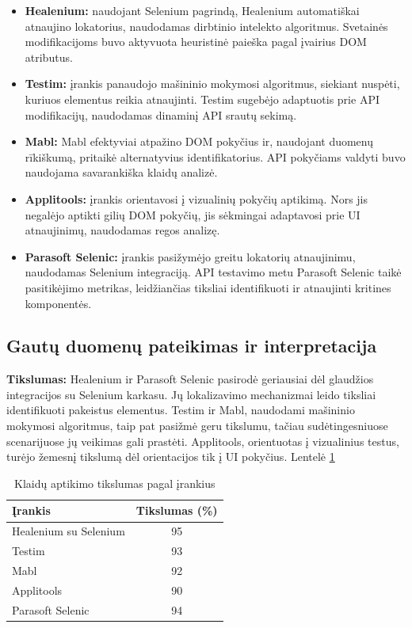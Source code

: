 \documentclass[
]{VUMIFPSkursinis}
\begin{document}
\begin{itemize}
    \item \textbf{Healenium:} naudojant Selenium pagrindą, Healenium automatiškai atnaujino lokatorius, naudodamas dirbtinio intelekto algoritmus. Svetainės modifikacijoms buvo aktyvuota heuristinė paieška pagal įvairius DOM atributus.
    \item \textbf{Testim:} įrankis panaudojo mašininio mokymosi algoritmus, siekiant nuspėti, kuriuos elementus reikia atnaujinti. Testim sugebėjo adaptuotis prie API modifikacijų, naudodamas dinaminį API srautų sekimą.
    \item \textbf{Mabl:} Mabl efektyviai atpažino DOM pokyčius ir, naudojant duomenų rīkiškumą, pritaikė alternatyvius identifikatorius. API pokyčiams valdyti buvo naudojama savarankiška klaidų analizė.
    \item \textbf{Applitools: } įrankis orientavosi į vizualinių pokyčių aptikimą. Nors jis negalėjo aptikti gilių DOM pokyčių, jis sėkmingai adaptavosi prie UI atnaujinimų, naudodamas regos analizę.
    \item \textbf{Parasoft Selenic:} įrankis pasižymėjo greitu lokatorių atnaujinimu, naudodamas Selenium integraciją. API testavimo metu Parasoft Selenic taikė pasitikėjimo metrikas, leidžiančias tiksliai identifikuoti ir atnaujinti kritines komponentės.
\end{itemize}

\subsection{Gautų duomenų pateikimas ir interpretacija}

\textbf{Tikslumas:} Healenium ir Parasoft Selenic pasirodė geriausiai dėl glaudžios integracijos su Selenium karkasu. Jų lokalizavimo mechanizmai leido tiksliai identifikuoti pakeistus elementus. Testim ir Mabl, naudodami mašininio mokymosi algoritmus, taip pat pasižmė geru tikslumu, tačiau sudėtingesniuose scenarijuose jų veikimas gali prastėti. Applitools, orientuotas į vizualinius testus, turėjo žemesnį tikslumą dėl orientacijos tik į UI pokyčius. Lentelė \ref{tab:Klaidų aptikimo tikslumas pagal įrankius}

\begin{table}[H]\footnotesize
  \centering
  \caption{Klaidų aptikimo tikslumas pagal įrankius}
  {\begin{tabular}{|l|c|} \hline
    Įrankis & Tikslumas (\%) \\
    \hline
    Healenium su Selenium & 95             \\
    Testim                & 93             \\
    Mabl                  & 92             \\
    Applitools            & 90             \\
    Parasoft Selenic      & 94             \\
    \hline
  \end{tabular}}
  \label{tab:Klaidų aptikimo tikslumas pagal įrankius}
\end{table}
\end{document}
